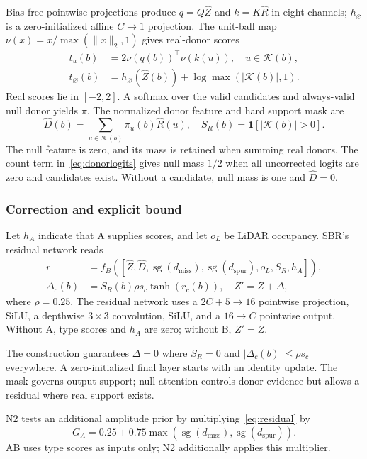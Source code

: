 \documentclass[conference]{IEEEtran}
\DeclareMathOperator{\sg}{sg}
\begin{document}
Bias-free pointwise projections produce $q=Q\widehat Z$ and $k=K\widehat R$ in eight channels; $h_{\varnothing}$ is a zero-initialized affine $C\!\to\!1$ projection. The unit-ball map $\nu(x)=x/\max(\lVert x\rVert_2,1)$ gives real-donor scores
\begin{align}
t_u(b)&=2\nu(q(b))^\top\nu(k(u)),\quad u\in\mathcal K(b),\nonumber\\
t_{\varnothing}(b)&=h_{\varnothing}(\widehat Z(b))+\log\max(|\mathcal K(b)|,1). \label{eq:donorlogits}
\end{align}
Real scores lie in $[-2,2]$. A softmax over the valid candidates and always-valid null donor yields $\pi$. The normalized donor feature and hard support mask are
\begin{equation}
\widehat D(b)=\sum_{u\in\mathcal K(b)}\pi_u(b)\widehat R(u),\quad
S_R(b)=\mathbf1[|\mathcal K(b)|>0]. \label{eq:donor}
\end{equation}
The null feature is zero, and its mass is retained when summing real donors. The count term in~\eqref{eq:donorlogits} gives null mass $1/2$ when all uncorrected logits are zero and candidates exist. Without a candidate, null mass is one and $\widehat D=0$.

\subsubsection{Correction and explicit bound}
Let $h_A$ indicate that A supplies scores, and let $o_L$ be LiDAR occupancy. SBR's residual network reads
\begin{align}
r&=f_B([\widehat Z,\widehat D,\sg(d_{\mathrm{miss}}),\sg(d_{\mathrm{spur}}),o_L,S_R,h_A]),\nonumber\\
\Delta_c(b)&=S_R(b)\rho s_c\tanh(r_c(b)),\quad Z'=Z+\Delta, \label{eq:residual}
\end{align}
where $\rho=0.25$. The residual network uses a $2C+5\!\to\!16$ pointwise projection, SiLU, a depthwise $3\times3$ convolution, SiLU, and a $16\!\to\!C$ pointwise output. Without A, type scores and $h_A$ are zero; without B, $Z'=Z$.

The construction guarantees $\Delta=0$ where $S_R=0$ and $|\Delta_c(b)|\leq\rho s_c$ everywhere. A zero-initialized final layer starts with an identity update. The mask governs output support; null attention controls donor evidence but allows a residual where real support exists.

N2 tests an additional amplitude prior by multiplying~\eqref{eq:residual} by
\begin{equation}
G_A=0.25+0.75\max(\sg(d_{\mathrm{miss}}),\sg(d_{\mathrm{spur}})). \label{eq:prior}
\end{equation}
AB uses type scores as inputs only; N2 additionally applies this multiplier.
\end{document}
